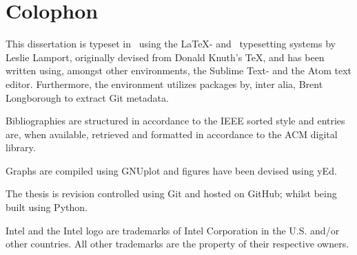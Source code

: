 
\chapter*{Colophon}
\label{cha:colophon}
This dissertation is typeset in \fonttostring\ using the \LaTeX - and \BibTeX\ typesetting systems by Leslie Lamport, originally devised from Donald Knuth's \TeX , and has been written using, amongst other environments, the Sublime Text- and the Atom text editor.
Furthermore, the environment utilizes packages by, inter alia, Brent Longborough to extract Git metadata.

Bibliographies are structured in accordance to the IEEE sorted style and entries are, when available, retrieved and formatted in accordance to the ACM digital library.

Graphs are compiled using GNUplot and figures have been devised using yEd.

The thesis is revision controlled using Git and hosted on GitHub; whilst being built using Python.

Intel and the Intel logo are trademarks of Intel Corporation in the U.S. and/or other countries.
All other trademarks are the property of their respective owners.







